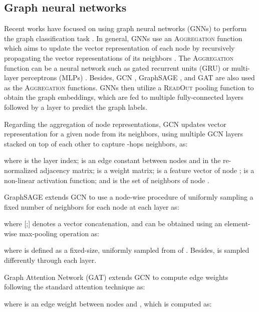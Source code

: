 \documentclass[twoside,leqno,twocolumn]{article}
\newcommand{\citep}{\cite}
\begin{document}
\subsection{Graph neural networks} Recent works have focused on using graph neural networks (GNNs) to perform the graph classification task \citep{scarselli2009graph,li2015gated,niepert2016learning,Gilmer2017,zhang2018end,Ying2018diffpool,verma2018graph,xu2019powerful}. 
In general, GNNs use an \textsc{Aggregation} function which aims to update the vector representation of each node by recursively propagating the vector representations of its neighbors \citep{scarselli2009graph,kipf2017semi,hamilton2017inductive,velickovic2018graph}.
The \textsc{Aggregation} function can be a neural network such as gated recurrent units (GRU) \citep{li2015gated} or multi-layer perceptrons (MLPs) \citep{xu2019powerful}.
Besides, GCN \citep{kipf2017semi}, GraphSAGE \citep{hamilton2017inductive}, and GAT \citep{velickovic2018graph} are also used as the \textsc{Aggregation} functions.
GNNs then utilize a \textsc{ReadOut} pooling function to obtain the graph embeddings, which are fed to multiple fully-connected layers followed by a  layer to predict the graph labels.


Regarding the aggregation of node representations, GCN \citep{kipf2017semi} updates vector representation for a given node  from its neighbors, using multiple GCN layers stacked on top of each other to capture -hops neighbors, as:

where  is the layer index;  is an edge constant between nodes  and  in the re-normalized adjacency matrix;  is a weight matrix;  is a feature vector of node ;  is a non-linear activation function; and  is the set of neighbors of node .

GraphSAGE \citep{hamilton2017inductive} extends GCN to use a node-wise procedure of uniformly sampling a fixed number of neighbors for each node at each layer as:

where [;] denotes a vector concatenation, and  can be obtained using an element-wise max-pooling operation as:

where  is defined as a fixed-size, uniformly sampled from  of . Besides,  is sampled differently through each layer.

Graph Attention Network (GAT) \citep{velickovic2018graph} extends GCN to compute edge weights following the standard attention technique \citep{bahdanau2014neural} as:

where  is an edge weight between nodes  and , which is computed as: 
\end{document}
